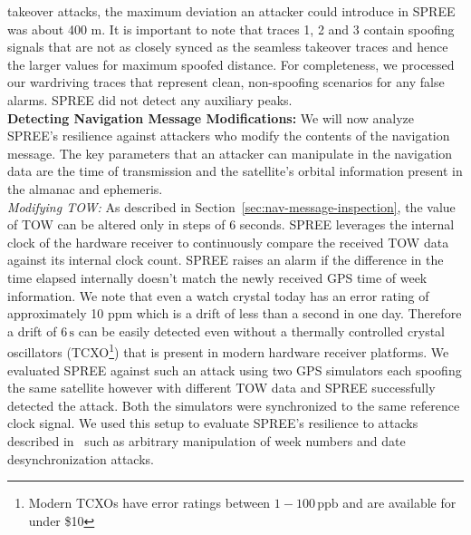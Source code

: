 \documentclass[letterpaper,twocolumn,10pt]{article}
\newcommand{\unit}[1]{\ensuremath{\, \mathrm{#1}}}
\newcommand{\rxname}{SPREE\xspace}
\begin{document}
takeover attacks, the maximum deviation an attacker could introduce in \rxname was about 400 m. It is important to note that traces 1, 2 and 3 contain spoofing signals that are not as closely synced as the seamless takeover traces and hence the larger values for maximum spoofed distance. For completeness, we processed our wardriving traces that represent clean, non-spoofing scenarios for any false alarms. \rxname did not detect any auxiliary peaks.\\



\noindent\textbf{Detecting Navigation Message Modifications:} We will now analyze \rxname's resilience against attackers who modify the contents of the navigation message. The key parameters that an attacker can manipulate in the navigation data are the time of transmission and the satellite's orbital information present in the almanac and ephemeris.\\ 


\noindent\textit{Modifying TOW:} As described in Section~\ref{sec:nav-message-inspection}, the value of TOW can be altered only in steps of 6 seconds. \rxname leverages the internal clock of the hardware receiver to continuously compare the received TOW data against its internal clock count. \rxname raises an alarm if the difference in the time elapsed internally doesn't match the newly received GPS time of week information. We note that even a watch crystal today has an error rating of approximately 10 ppm which is a drift of less than a second in one day. Therefore a drift of $6\unit{s}$ can be easily detected even without a thermally controlled crystal oscillators (TCXO\footnote{Modern TCXOs have error ratings between $1-100\unit{ppb}$ and are available for under \$10}) that is present in modern hardware receiver platforms. We evaluated \rxname against such an attack using two GPS simulators each spoofing the same satellite however with different TOW data and \rxname successfully detected the attack. Both the simulators were synchronized to the same reference clock signal. We used this setup to evaluate \rxname's resilience to attacks described in~\cite{NighswanderCCS2012} such as arbitrary manipulation of week numbers and date desynchronization attacks.\\
\end{document}
